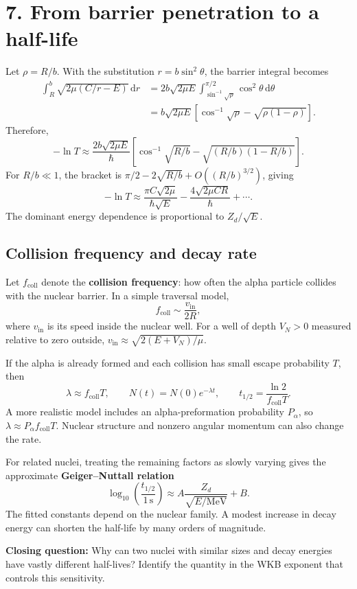 \documentclass[11pt]{article}
\newcommand{\dd}{\,\mathrm{d}}
\begin{document}
\newpage
\section*{7. From barrier penetration to a half-life}
Let $\rho=R/b$. With the substitution $r=b\sin^2\theta$, the barrier integral becomes
\begin{align}
\int_R^b\sqrt{2\mu(C/r-E)}\dd r
&=2b\sqrt{2\mu E}\int_{\sin^{-1}\sqrt\rho}^{\pi/2}\cos^2\theta\dd\theta\\
&=b\sqrt{2\mu E}
\left[\cos^{-1}\sqrt\rho-\sqrt{\rho(1-\rho)}\right].
\end{align}
Therefore,
\begin{equation}
\boxed{-\ln T\approx\frac{2b\sqrt{2\mu E}}{\hbar}
\left[\cos^{-1}\sqrt{R/b}-\sqrt{(R/b)(1-R/b)}\right].}
\end{equation}
For $R/b\ll1$, the bracket is $\pi/2-2\sqrt{R/b}+O((R/b)^{3/2})$, giving
\begin{equation}
-\ln T\approx\frac{\pi C\sqrt{2\mu}}{\hbar\sqrt E}
-\frac{4\sqrt{2\mu CR}}{\hbar}+\cdots.
\end{equation}
The dominant energy dependence is proportional to $Z_d/\sqrt E$.

\subsection*{Collision frequency and decay rate}
Let $f_{\mathrm{coll}}$ denote the \textbf{collision frequency}: how often the alpha particle collides with the nuclear barrier. In a simple traversal model,
\begin{equation}
f_{\mathrm{coll}}\sim\frac{v_{\mathrm{in}}}{2R},
\end{equation}
where $v_{\mathrm{in}}$ is its speed inside the nuclear well. For a well of depth $V_N>0$ measured relative to zero outside, $v_{\mathrm{in}}\approx\sqrt{2(E+V_N)/\mu}$.

If the alpha is already formed and each collision has small escape probability $T$, then
\begin{equation}
\lambda\approx f_{\mathrm{coll}}T,\qquad
N(t)=N(0)e^{-\lambda t},\qquad
\boxed{t_{1/2}=\frac{\ln2}{f_{\mathrm{coll}}T}.}
\end{equation}
A more realistic model includes an alpha-preformation probability $P_\alpha$, so $\lambda\approx P_\alpha f_{\mathrm{coll}}T$. Nuclear structure and nonzero angular momentum can also change the rate.

For related nuclei, treating the remaining factors as slowly varying gives the approximate \textbf{Geiger--Nuttall relation}
\begin{equation}
\boxed{\log_{10}\!\left(\frac{t_{1/2}}{1\,\mathrm{s}}\right)
\approx A\frac{Z_d}{\sqrt{E/\mathrm{MeV}}}+B.}
\end{equation}
The fitted constants depend on the nuclear family. A modest increase in decay energy can shorten the half-life by many orders of magnitude.

\textbf{Closing question:} Why can two nuclei with similar sizes and decay energies have vastly different half-lives? Identify the quantity in the WKB exponent that controls this sensitivity.
\end{document}
